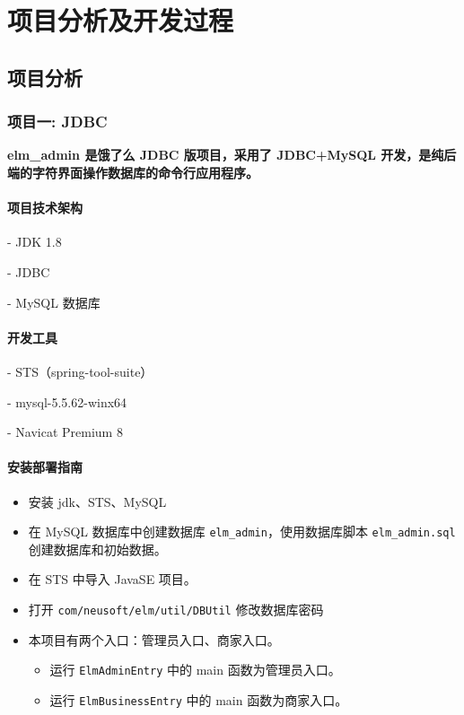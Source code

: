 
\chapter{项目分析及开发过程}

\section{项目分析}
\subsection{项目一: JDBC}
\textbf{elm\_admin 是饿了么 JDBC 版项目，采用了 JDBC+MySQL 开发，是纯后端的字符界面操作数据库的命令行应用程序。}

\subsubsection{项目技术架构}
- JDK 1.8

- JDBC

- MySQL 数据库

\subsubsection{开发工具}
- STS（spring-tool-suite）

- mysql-5.5.62-winx64

- Navicat Premium 8

\subsubsection{安装部署指南}
\begin{itemize}
  \item 安装 jdk、STS、MySQL
  \item 在 MySQL 数据库中创建数据库 \texttt{elm\_admin}，使用数据库脚本 \texttt{elm\_admin.sql} 创建数据库和初始数据。  \item 在 STS 中导入 JavaSE 项目。
  \item 打开 \texttt{com/neusoft/elm/util/DBUtil} 修改数据库密码
  \item 本项目有两个入口：管理员入口、商家入口。
      \begin{itemize}
          \item 运行 \texttt{ElmAdminEntry} 中的 main 函数为管理员入口。
          \item 运行 \texttt{ElmBusinessEntry} 中的 main 函数为商家入口。
      \end{itemize}
\end{itemize}
